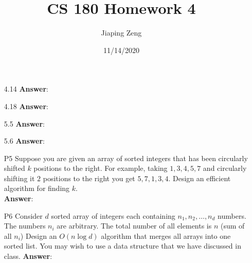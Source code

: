 \documentclass{article}
\title{CS 180 Homework 4}
\date{11/14/2020}
\author{Jiaping Zeng}
\begin{document}
\maketitle

\begin{itemize}
      \item [4.14]
            \textbf{Answer}:
      \item [4.18]\textbf{Answer}:
      \item [5.5]
            \textbf{Answer}:
      \item [5.6]
            \textbf{Answer}:
      \item [P5] Suppose you are given an array of sorted integers that has been circularly shifted $k$ positions to the right. For example, taking $1,3,4,5,7$ and circularly shifting it $2$ positions to the right you get $5,7,1,3,4$. Design an efficient algorithm for finding $k$.\\
            \textbf{Answer}:
      \item [P6] Consider $d$ sorted array of integers each containing $n_1,n_2,\ldots,n_d$ numbers. The numbers $n_i$ are arbitrary. The total number of all elements is $n$ (sum of all $n_i$) Design an $O(n\log d)$ algorithm that merges all arrays into one sorted list. You may wish to use a data structure that we have discussed in class.
            \textbf{Answer}:
\end{itemize}
\end{document}
